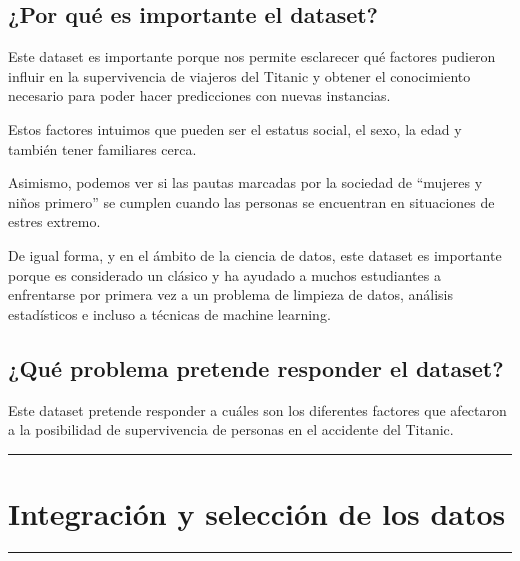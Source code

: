 \documentclass[
]{article}
\begin{document}
\hypertarget{por-quuxe9-es-importante-el-dataset}{%
\subsection{\texorpdfstring{\textbf{¿Por qué es importante el
dataset?}}{¿Por qué es importante el dataset?}}\label{por-quuxe9-es-importante-el-dataset}}

Este dataset es importante porque nos permite esclarecer qué factores
pudieron influir en la supervivencia de viajeros del Titanic y obtener
el conocimiento necesario para poder hacer predicciones con nuevas
instancias.

Estos factores intuimos que pueden ser el estatus social, el sexo, la
edad y también tener familiares cerca.

Asimismo, podemos ver si las pautas marcadas por la sociedad de
``mujeres y niños primero'' se cumplen cuando las personas se encuentran
en situaciones de estres extremo.

De igual forma, y en el ámbito de la ciencia de datos, este dataset es
importante porque es considerado un clásico y ha ayudado a muchos
estudiantes a enfrentarse por primera vez a un problema de limpieza de
datos, análisis estadísticos e incluso a técnicas de machine learning.

\hypertarget{quuxe9-problema-pretende-responder-el-dataset}{%
\subsection{\texorpdfstring{\textbf{¿Qué problema pretende responder el
dataset?}}{¿Qué problema pretende responder el dataset?}}\label{quuxe9-problema-pretende-responder-el-dataset}}

Este dataset pretende responder a cuáles son los diferentes factores que
afectaron a la posibilidad de supervivencia de personas en el accidente
del Titanic.

\begin{center}\rule{0.5\linewidth}{0.5pt}\end{center}

\hypertarget{integraciuxf3n-y-selecciuxf3n-de-los-datos}{%
\section{\texorpdfstring{\textbf{Integración y selección de los
datos}}{Integración y selección de los datos}}\label{integraciuxf3n-y-selecciuxf3n-de-los-datos}}

\begin{center}\rule{0.5\linewidth}{0.5pt}\end{center}
\end{document}
